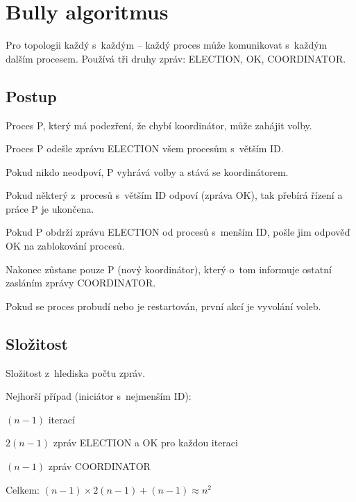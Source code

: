 
\section{Bully algoritmus}

Pro topologii každý s~každým -- každý proces může komunikovat s~každým dalším procesem. Používá tři druhy zpráv: ELECTION, OK, COORDINATOR.

\subsection{Postup}

\begin{compactitem}
    \item Proces P, který má podezření, že chybí koordinátor, může zahájit volby.
    \begin{compactenum}
        \item Proces P odešle zprávu ELECTION všem procesům s~větším ID.
        \item Pokud nikdo neodpoví, P vyhrává volby a stává se koordinátorem.
        \item Pokud některý z~procesů s~větším ID odpoví (zpráva OK), tak přebírá řízení a práce P je ukončena.
        \item Pokud P obdrží zprávu ELECTION od procesů s~menším ID, pošle jim odpověď OK na zablokování procesů.
    \end{compactenum}
    \item Nakonec zůstane pouze P (nový koordinátor), který o~tom informuje ostatní zasláním zprávy COORDINATOR.
    \item Pokud se proces probudí nebo je restartován, první akcí je vyvolání voleb.
\end{compactitem}

\subsection{Složitost}

Složitost z~hlediska počtu zpráv.

\bigskip\noindent Nejhorší případ (iniciátor s~nejmenším ID):

\begin{compactitem}
    \item $(n-1)$ iterací
    \item $2(n-1)$ zpráv ELECTION a OK pro každou iteraci
    \item $(n-1)$ zpráv COORDINATOR
    \item Celkem: $(n-1) \times 2(n-1) + (n-1) \approx n^2$
\end{compactitem}

